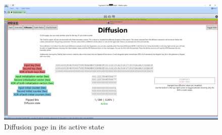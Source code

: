 \begin{figure}
\centering
\includegraphics[width=\textwidth]{figures/ct2/diffusion/diffusion-active.png}
\caption{Diffusion page in its active state}
\label{fig:diffusion}
\end{figure}

